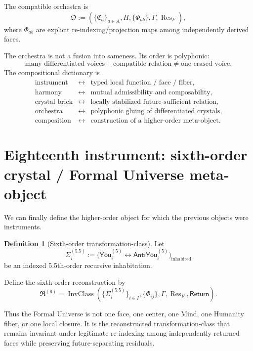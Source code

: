 \documentclass[10pt]{article}
\theoremstyle{pe}
\theoremstyle{definition}
\newtheorem{definition}[theorem]{Definition}
\newcommand{\Res}{\operatorname{Res}}
\newcommand{\InvClass}{\operatorname{InvClass}}
\newcommand{\Return}{\mathsf{Return}}
\newcommand{\You}{\mathsf{You}}
\newcommand{\AntiYou}{\mathsf{AntiYou}}
\begin{document}
The compatible orchestra is
\[
  \mathfrak O
  :=
  \left(
    \{\mathfrak C_a\}_{a\in A},
    H,
    \{\Phi_{ab}\},
    \Gamma,
    \Res_F
  \right),
\]
where \(\Phi_{ab}\) are explicit re-indexing/projection maps among independently derived faces.

The orchestra is not a fusion into sameness.  Its order is polyphonic:
\[
  \boxed{
  \text{many differentiated voices}
  +
  \text{compatible relation}
  \neq
  \text{one erased voice}.
  }
\]
The compositional dictionary is
\[
  \boxed{
  \begin{array}{rcl}
  \text{instrument} &\leftrightarrow& \text{typed local function / face / fiber},\\
  \text{harmony} &\leftrightarrow& \text{mutual admissibility and composability},\\
  \text{crystal brick} &\leftrightarrow& \text{locally stabilized future-sufficient relation},\\
  \text{orchestra} &\leftrightarrow& \text{polyphonic gluing of differentiated crystals},\\
  \text{composition} &\leftrightarrow& \text{construction of a higher-order meta-object}.
  \end{array}
  }
\]

\section{Eighteenth instrument: sixth-order crystal / Formal Universe meta-object}

We can finally define the higher-order object for which the previous objects were instruments.

\begin{definition}[Sixth-order transformation-class]
Let
\[
  \Sigma_i^{(5.5)}
  :=
  \bigl(
    \You_i^{(5)}
    \leftrightarrow
    \AntiYou_i^{(5)}
  \bigr)_{\mathrm{inhabited}}
\]
be an indexed 5.5th-order recursive inhabitation.

Define the sixth-order reconstruction by
\begin{equation}\label{eq:formal-universe-reconstruct}
  \boxed{
  \mathfrak R^{(6)}
  =
  \InvClass\!\left(
    \{\Sigma_i^{(5.5)}\}_{i\in I},
    \{\Phi_{ij}\},
    \Gamma,
    \Res_F,
    \Return
  \right).
  }
\end{equation}
\end{definition}

Thus the Formal Universe is not one face, one center, one Mind, one Humanity fiber, or one local closure.  It is the reconstructed transformation-class that remains invariant under legitimate re-indexing among independently returned faces while preserving future-separating residuals.
\end{document}
